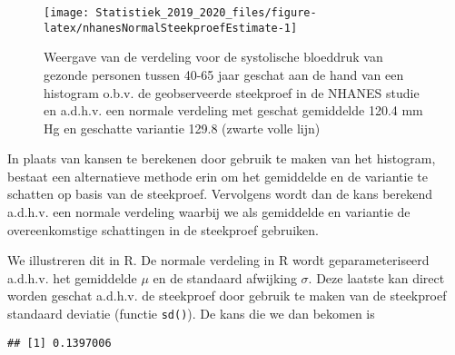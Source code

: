 \documentclass[12pt,dutch,coursenotes]{book}
\newenvironment{Shaded}{\begin{snugshade}}{\end{snugshade}}
\newcommand{\KeywordTok}[1]{\textcolor[rgb]{0.13,0.29,0.53}{\textbf{#1}}}
\newcommand{\DataTypeTok}[1]{\textcolor[rgb]{0.13,0.29,0.53}{#1}}
\newcommand{\DecValTok}[1]{\textcolor[rgb]{0.00,0.00,0.81}{#1}}
\newcommand{\StringTok}[1]{\textcolor[rgb]{0.31,0.60,0.02}{#1}}
\newcommand{\OperatorTok}[1]{\textcolor[rgb]{0.81,0.36,0.00}{\textbf{#1}}}
\newcommand{\NormalTok}[1]{#1}
\theoremstyle{definition}
\theoremstyle{definition}
\theoremstyle{definition}
\theoremstyle{remark}
\begin{document}
\begin{figure}

{\centering \texttt{[image: Statistiek\_2019\_2020\_files/figure-latex/nhanesNormalSteekproefEstimate-1]} 

}

\caption{Weergave van de verdeling voor de systolische bloeddruk van gezonde personen tussen 40-65 jaar geschat aan de hand van een histogram o.b.v. de geobserveerde steekproef in de NHANES studie en a.d.h.v. een normale verdeling met geschat gemiddelde 120.4 mm Hg en geschatte variantie 129.8 (zwarte volle lijn)}\label{fig:nhanesNormalSteekproefEstimate}
\end{figure}

In plaats van kansen te berekenen door gebruik te maken van het
histogram, bestaat een alternatieve methode erin om het gemiddelde en de
variantie te schatten op basis van de steekproef. Vervolgens wordt dan
de kans berekend a.d.h.v. een normale verdeling waarbij we als
gemiddelde en variantie de overeenkomstige schattingen in de steekproef
gebruiken.

We illustreren dit in R. De normale verdeling in R wordt
geparameteriseerd a.d.h.v. het gemiddelde \(\mu\) en de standaard
afwijking \(\sigma\). Deze laatste kan direct worden geschat a.d.h.v. de
steekproef door gebruik te maken van de steekproef standaard deviatie
(functie \texttt{sd()}). De kans die we dan bekomen is

\begin{Shaded}
\end{Shaded}

\begin{verbatim}
## [1] 0.1397006
\end{verbatim}
\end{document}
